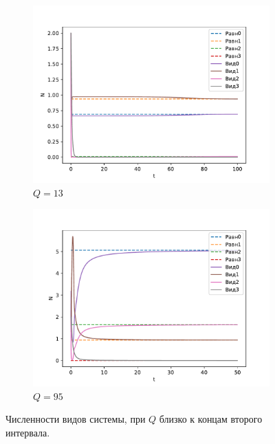 \begin{figure}[H]
    \centering
    \begin{subfigure}[t]{.45\linewidth}
        \centering
        \includegraphics[width=\textwidth]{pictures/exp_flow/exp1_Q13.pdf}
        \caption{\(Q = 13\)}
    \end{subfigure}
    \begin{subfigure}[t]{.45\linewidth}
            \centering
            \includegraphics[width=\textwidth]{pictures/exp_flow/exp1_Q95.pdf}
            \caption{\(Q = 95\)}
        \end{subfigure}
    \caption{Численности видов системы, при \(Q\) близко к концам второго интервала.}  \label{fig:flow_exp1_q2}
\end{figure}


